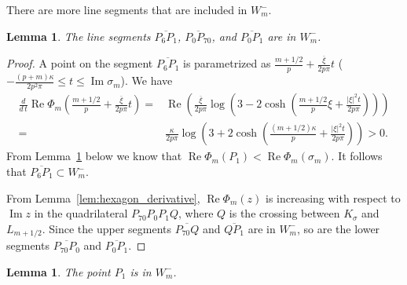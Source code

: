 \documentclass[a4paper,dvipdfmx]{amsart}
\theoremstyle{plain}
\newtheorem{lem}[thm]{Lemma}
\theoremstyle{definition}
\theoremstyle{remark}
\renewcommand{\Re}{\operatorname{Re}}
\renewcommand{\Im}{\operatorname{Im}}
\newcommand{\saddle}{\sigma}
\numberwithin{equation}{section}
\begin{document}
There are more line segments that are included in $W^{-}_m$.
\begin{lem}\label{lem:segments_W-m}
The line segments $\overline{P_{6}P_{1}}$, $\overline{P_{0}P_{70}}$, and $\overline{P_{0}P_{1}}$ are in $W^{-}_m$.
\end{lem}
\begin{proof}
\par
A point on the segment $\overline{P_{6}P_{1}}$ is parametrized as $\frac{m+1/2}{p}+\frac{\overline{\xi}}{2p\pi}t$ ($-\frac{(p+m)\kappa}{2p^2\pi}\le t\le\Im\saddle_m$).
We have
\begin{align*}
  \frac{d}{d\,t}\Re\Phi_m\left(\frac{m+1/2}{p}+\frac{\overline{\xi}}{2p\pi}t\right)
  =&
  \Re
  \left(
    \frac{\overline{\xi}}{2p\pi}
    \log
    \left(
      3-2\cosh\left(\frac{m+1/2}{p}\xi+\frac{|\xi|^2t}{2p\pi}\right)
    \right)
  \right)
  \\
  =&
  \frac{\kappa}{2p\pi}
  \log
  \left(
    3+2\cosh\left(\frac{(m+1/2)\kappa}{p}+\frac{|\xi|^2t}{2p\pi}\right)
  \right)>0.
\end{align*}
From Lemma~\ref{lem:P1} below we know that $\Re\Phi_m(P_{1})<\Re\Phi_m(\saddle_m)$.
It follows that $\overline{P_{6}P_{1}}\subset W^{-}_m$.
\par
From Lemma~\ref{lem:hexagon_derivative}, $\Re\Phi_m(z)$ is increasing with respect to $\Im{z}$ in the quadrilateral $P_{70}P_0P_1Q$, where $Q$ is the crossing between $K_{\saddle}$ and $L_{m+1/2}$.
Since the upper segments $\overline{P_{70}Q}$ and $\overline{QP_1}$ are in $W^{-}_m$, so are the lower segments $\overline{P_{70}P_0}$ and $\overline{P_0P_1}$.
\end{proof}
\begin{lem}\label{lem:P1}
The point $P_1$ is in $W^{-}_m$.
\end{lem}
\end{document}
